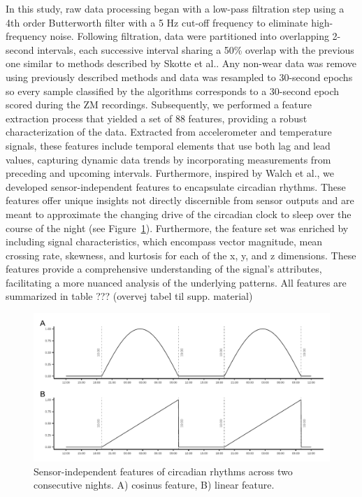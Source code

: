 \documentclass[
  super,
  preprint,
  3p]{elsarticle}
\begin{document}
In this study, raw data processing began with a low-pass filtration step
using a 4th order Butterworth filter with a 5 Hz cut-off frequency to
eliminate high-frequency noise. Following filtration, data were
partitioned into overlapping 2-second intervals, each successive
interval sharing a 50\% overlap with the previous one similar to methods
described by Skotte et al.\citep{skotte_detection_2014}. Any non-wear
data was remove using previously described methods\citep{skovgaard2023}
and data was resampled to 30-second epochs so every sample classified by
the algorithms corresponds to a 30-second epoch scored during the ZM
recordings. Subsequently, we performed a feature extraction process that
yielded a set of 88 features, providing a robust characterization of the
data. Extracted from accelerometer and temperature signals, these
features include temporal elements that use both lag and lead values,
capturing dynamic data trends by incorporating measurements from
preceding and upcoming intervals. Furthermore, inspired by Walch et
al.\citep{walch2019}, we developed sensor-independent features to
encapsulate circadian rhythms. These features offer unique insights not
directly discernible from sensor outputs and are meant to approximate
the changing drive of the circadian clock to sleep over the course of
the night (see Figure~\ref{fig-sensor-independent}). Furthermore, the
feature set was enriched by including signal characteristics, which
encompass vector magnitude, mean crossing rate, skewness, and kurtosis
for each of the x, y, and z dimensions. These features provide a
comprehensive understanding of the signal's attributes, facilitating a
more nuanced analysis of the underlying patterns. All features are
summarized in table ??? (overvej tabel til supp. material)

\begin{figure}[b]

{\centering \includegraphics{visuals/sensor_independent.pdf}

}

\caption{\label{fig-sensor-independent}Sensor-independent features of
circadian rhythms across two consecutive nights. A) cosinus feature, B)
linear feature.}

\end{figure}
\end{document}
